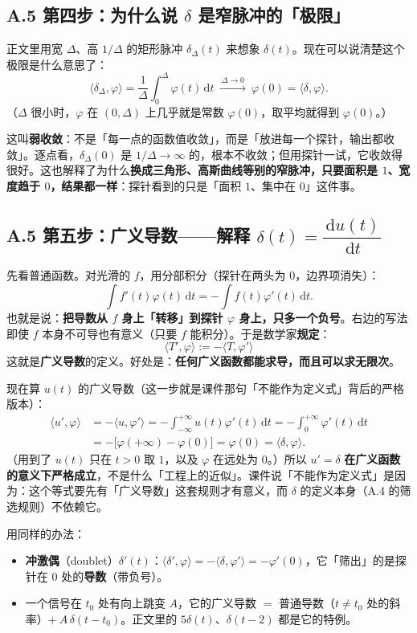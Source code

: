 \documentclass[UTF8,a4paper,11pt]{ctexart}
\renewcommand{\d}{\,\mathrm{d}}
\begin{document}
\subsection*{A.5 第四步：为什么说 $\delta$ 是窄脉冲的「极限」}
正文里用宽 $\Delta$、高 $1/\Delta$ 的矩形脉冲 $\delta_\Delta(t)$ 来想象 $\delta(t)$。现在可以说清楚这个极限是什么意思了：
\[
\langle\delta_\Delta,\varphi\rangle=\frac{1}{\Delta}\int_0^{\Delta}\varphi(t)\d t
\ \xrightarrow{\ \Delta\to0\ }\ \varphi(0)=\langle\delta,\varphi\rangle .
\]
（$\Delta$ 很小时，$\varphi$ 在 $(0,\Delta)$ 上几乎就是常数 $\varphi(0)$，取平均就得到 $\varphi(0)$。）

这叫\textbf{弱收敛}：不是「每一点的函数值收敛」，而是「放进每一个探针，输出都收敛」。逐点看，$\delta_\Delta(0)$ 是 $1/\Delta\to\infty$ 的，根本不收敛；但用探针一试，它收敛得很好。这也解释了为什么\textbf{换成三角形、高斯曲线等别的窄脉冲，只要面积是 $1$、宽度趋于 $0$，结果都一样}：探针看到的只是「面积 $1$、集中在 $0$」这件事。

\subsection*{A.5 第五步：广义导数——解释 $\delta(t)=\dfrac{\d u(t)}{\d t}$}
先看普通函数。对光滑的 $f$，用分部积分（探针在两头为 $0$，边界项消失）：
\[
\int f'(t)\varphi(t)\d t=-\int f(t)\varphi'(t)\d t .
\]
也就是说：\textbf{把导数从 $f$ 身上「转移」到探针 $\varphi$ 身上，只多一个负号}。右边的写法即使 $f$ 本身不可导也有意义（只要 $f$ 能积分）。于是数学家\textbf{规定}：
\[
\langle T',\varphi\rangle:=-\langle T,\varphi'\rangle
\]
这就是\textbf{广义导数}的定义。好处是：\textbf{任何广义函数都能求导，而且可以求无限次}。

现在算 $u(t)$ 的广义导数（这一步就是课件那句「不能作为定义式」背后的严格版本）：
\begin{align*}
\langle u',\varphi\rangle
&=-\langle u,\varphi'\rangle=-\int_{-\infty}^{+\infty}u(t)\varphi'(t)\d t
=-\int_{0}^{+\infty}\varphi'(t)\d t\\
&=-\bigl[\varphi(+\infty)-\varphi(0)\bigr]=\varphi(0)=\langle\delta,\varphi\rangle .
\end{align*}
（用到了 $u(t)$ 只在 $t>0$ 取 $1$，以及 $\varphi$ 在远处为 $0$。）所以 $u'=\delta$ \textbf{在广义函数的意义下严格成立}，不是什么「工程上的近似」。课件说「不能作为定义式」是因为：这个等式要先有「广义导数」这套规则才有意义，而 $\delta$ 的定义本身（A.4 的筛选规则）不依赖它。

用同样的办法：
\begin{itemize}[nosep]
\item \textbf{冲激偶}（doublet）$\delta'(t)$：$\langle\delta',\varphi\rangle=-\langle\delta,\varphi'\rangle=-\varphi'(0)$，它「筛出」的是探针在 $0$ 处的\textbf{导数}（带负号）。
\item 一个信号在 $t_0$ 处有向上跳变 $A$，它的广义导数 $=$ 普通导数（$t\neq t_0$ 处的斜率）$+\ A\,\delta(t-t_0)$。正文里的 $5\delta(t)$、$\delta(t-2)$ 都是它的特例。
\end{itemize}
\end{document}
